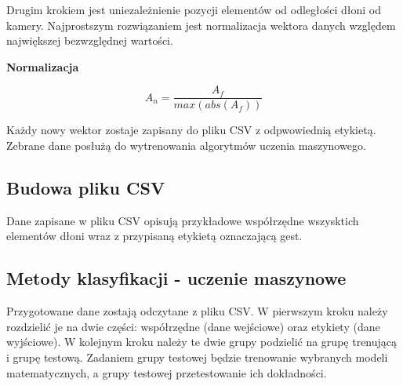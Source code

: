     
    \quad Drugim krokiem jest uniezależnienie pozycji elementów od odległości dłoni od kamery. Najprostszym rozwiązaniem jest normalizacja wektora danych względem największej bezwzględnej wartości. 
    
    \quad \textbf{Normalizacja}
    
    
    
    \begin{equation*}
        A_n=\dfrac{A_f}{max(abs(A_f))}
    \end{equation*}
    
    \quad Każdy nowy wektor zostaje zapisany do pliku CSV z odpwowiednią etykietą. Zebrane dane posłużą do wytrenowania algorytmów uczenia maszynowego.     
    
    \subsection{Budowa pliku CSV}
    \quad Dane zapisane w pliku CSV opisują przykładowe współrzędne wszysktich elementów dłoni wraz z przypisaną etykietą oznaczającą gest. 

    \subsection{Metody klasyfikacji - uczenie maszynowe}
    
    \quad Przygotowane dane zostają odczytane z pliku CSV. W pierwszym kroku należy rozdzielić je na dwie części: współrzędne (dane wejściowe) oraz etykiety (dane wyjściowe). W kolejnym kroku należy te dwie grupy podzielić na grupę trenującą i grupę testową. Zadaniem grupy testowej będzie trenowanie wybranych modeli matematycznych, a grupy testowej przetestowanie ich dokładności. 

